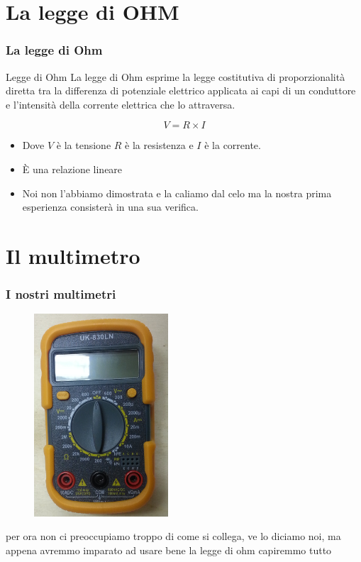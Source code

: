 	\section{La legge di OHM} %
	\label{sec:la_legge_di_ohm}
		\begin{frame}[c]\frametitle{La legge di Ohm}
		     \begin{block}{Legge di Ohm}
		     	La legge di Ohm esprime la legge costitutiva di proporzionalità diretta tra la differenza di potenziale elettrico applicata ai capi di un conduttore e l'intensità della corrente elettrica che lo attraversa. 	
		     \end{block}
			\[
				V = R \times I
			\]

			\begin{itemize}
				\pause
				\item Dove $V$ è la tensione $R$ è la resistenza e $I$ è la corrente.
				\pause
			 	\item \`E una relazione lineare
			 	\pause
			 	\item Noi non l'abbiamo dimostrata e la caliamo dal celo ma la nostra prima esperienza consisterà in una sua verifica.
			 \end{itemize} 

		\end{frame}

	\section{Il multimetro} %
	\label{sec:il_multimetro}
		\begin{frame}[c]\frametitle{I nostri multimetri}
		    
			\begin{figure}[tb]
				\centering
				\includegraphics[width= 5cm]{./img/M_small.jpg}
				\label{fig:figure3}
			\end{figure}

			per ora non ci preoccupiamo troppo di come si collega, ve lo diciamo noi, ma appena avremmo imparato ad usare bene la legge di ohm capiremmo tutto		
		\end{frame}

